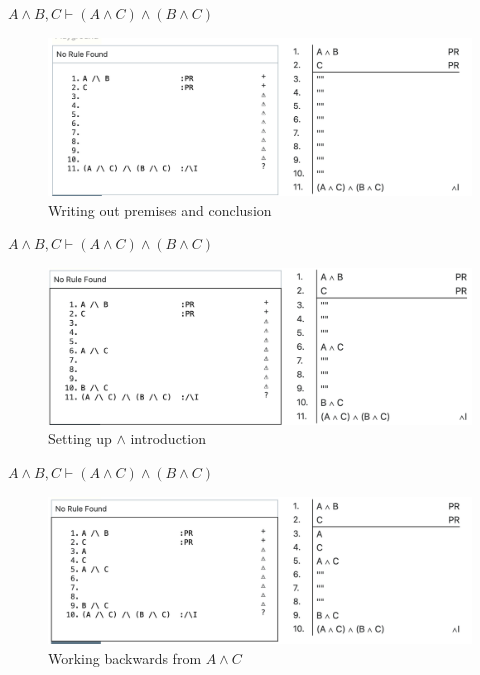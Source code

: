 \documentclass[
  ignorenonframetext,
]{beamer}
\renewcommand{\,}{\text{, }}
\begin{document}
\begin{frame}{\(A \wedge B, C \vdash (A \wedge C) \wedge (B \wedge C)\)}
\protect\hypertarget{a-wedge-b-c-vdash-a-wedge-c-wedge-b-wedge-c}{}
\begin{figure}
\centering
\includegraphics[width=\textwidth,height=0.75\textheight]{5_4a.png}
\caption{Writing out premises and conclusion}
\end{figure}
\end{frame}

\begin{frame}{\(A \wedge B, C \vdash (A \wedge C) \wedge (B \wedge C)\)}
\protect\hypertarget{a-wedge-b-c-vdash-a-wedge-c-wedge-b-wedge-c-1}{}
\begin{figure}
\centering
\includegraphics[width=\textwidth,height=0.75\textheight]{5_4b.png}
\caption{Setting up \(\wedge\) introduction}
\end{figure}
\end{frame}

\begin{frame}{\(A \wedge B, C \vdash (A \wedge C) \wedge (B \wedge C)\)}
\protect\hypertarget{a-wedge-b-c-vdash-a-wedge-c-wedge-b-wedge-c-2}{}
\begin{figure}
\centering
\includegraphics[width=\textwidth,height=0.75\textheight]{5_4c.png}
\caption{Working backwards from \(A \wedge C\)}
\end{figure}
\end{frame}
\end{document}
